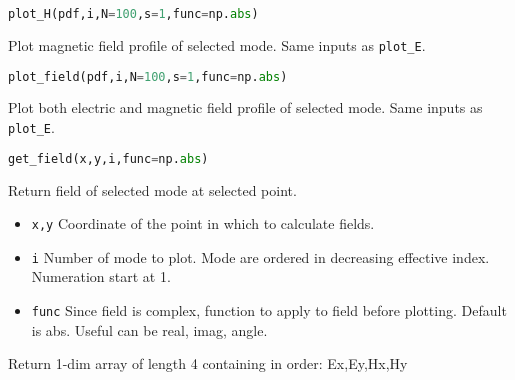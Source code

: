 \documentclass[a4paper,10pt]{report}
\begin{document}
\begin{lstlisting}[language=Python,basicstyle=\ttfamily\Large]
plot_H(pdf,i,N=100,s=1,func=np.abs)
\end{lstlisting}
Plot magnetic field profile of selected mode. Same inputs as \texttt{plot\_E}.

\begin{lstlisting}[language=Python,basicstyle=\ttfamily\Large]
plot_field(pdf,i,N=100,s=1,func=np.abs)
\end{lstlisting}
Plot both electric and magnetic field profile of selected mode. Same inputs as \texttt{plot\_E}. 

\begin{lstlisting}[language=Python,basicstyle=\ttfamily\Large]
get_field(x,y,i,func=np.abs)
\end{lstlisting}
Return field of selected mode at selected point. 
\begin{itemize}[noitemsep,topsep=0pt,parsep=0pt,partopsep=0pt]
\item \texttt{x,y} Coordinate of the point in which to calculate fields.
\item \texttt{i} Number of mode to plot. Mode are ordered in decreasing effective index. Numeration start at 1.
\item \texttt{func} Since field is complex, function to apply to field before plotting. Default is abs. Useful can be real, imag, angle. 
\end{itemize}
Return 1-dim array of length 4 containing in order: Ex,Ey,Hx,Hy
\end{document}
